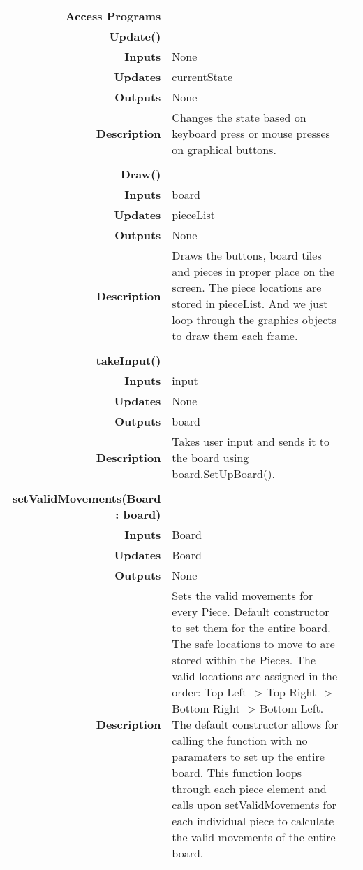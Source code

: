 \documentclass[10pt]{article}
\begin{document}
\begin{tabularx}{\linewidth}{ >{\bfseries}r Xp{5cm} }
            Access Programs & \begin{tabular}[t]{@{} l p{8cm}} 
                                     & \\
                                    \bf{Update()} & \\
                                    Inputs &  None \\
                                    Updates & currentState \\
                                    Outputs & None \\
                                    Description & Changes the state based on keyboard press or mouse presses on graphical buttons.\\
                                     & \\
                                    \bf{Draw()} & \\
                                    Inputs & board \\
                                    Updates & pieceList \\
                                    Outputs & None \\
                                    Description & Draws the buttons, board tiles and pieces in proper place on the screen. The piece locations are stored in pieceList. And we just loop through the graphics objects to draw them each frame. \\
                                     & \\
                                    \bf{takeInput()} & \\
                                    Inputs & input \\
                                    Updates & None \\
                                    Outputs & board \\ 
                                    Description & Takes user input and sends it to the board using board.SetUpBoard().\\
                                    & \\
                                    \bf{setValidMovements(Board : board)} & \\
                                    Inputs & Board \\
                                    Updates & Board \\
                                    Outputs & None \\
                                    Description & Sets the valid movements for every Piece. Default constructor to set them for the entire board. The safe locations to move to are stored within the Pieces. The valid locations are assigned in the order: Top Left -> Top Right -> Bottom Right -> Bottom Left. The default constructor allows for calling the function with no paramaters to set up the entire board. This function loops through each piece element and calls upon setValidMovements for each individual piece to calculate the valid movements of the entire board.

\end{tabular}
\end{tabularx}
\end{document}
